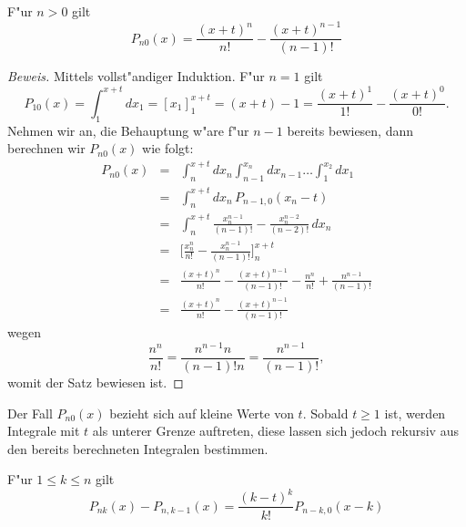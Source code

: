 \begin{satz}F"ur $n>0$ gilt
\begin{equation}
P_{n0}(x)=\frac{(x+t)^n}{n!}-\frac{(x+t)^{n-1}}{(n-1)!}
\end{equation}
\end{satz}
\begin{proof}[Beweis]
Mittels vollst"andiger Induktion. F"ur $n=1$ gilt
\[
P_{10}(x)=\int_1^{x+t}dx_1=[x_1]_1^{x+t}=(x+t)-1=\frac{(x+t)^1}{1!}-\frac{(x+t)^0}{0!}.
\]
Nehmen wir an, die Behauptung w"are f"ur $n-1$ bereits bewiesen, dann
berechnen wir $P_{n0}(x)$ wie folgt:
\begin{eqnarray*}
P_{n0}(x)
&=&\int_n^{x+t}dx_n\int_{n-1}^{x_n}dx_{n-1}\dots\int_1^{x_2}dx_1\\
&=&\int_n^{x+t}dx_n\,P_{n-1,0}(x_n-t)\\
&=&\int_n^{x+t}\frac{x_n^{n-1}}{(n-1)!}-\frac{x_n^{n-2}}{(n-2)!}\,dx_n\\
&=&\biggl[\frac{x_n^n}{n!}-\frac{x_n^{n-1}}{(n-1)!}\biggr]_n^{x+t}\\
&=&
\frac{(x+t)^n}{n!}-\frac{(x+t)^{n-1}}{(n-1)!}
-\frac{n^n}{n!}+\frac{n^{n-1}}{(n-1)!}\\
&=&
\frac{(x+t)^n}{n!}-\frac{(x+t)^{n-1}}{(n-1)!}
\end{eqnarray*}
wegen
\[
\frac{n^n}{n!}=\frac{n^{n-1}n}{(n-1)! n}=\frac{n^{n-1}}{(n-1)!},
\]
womit der Satz bewiesen ist.
\end{proof}

Der Fall $P_{n0}(x)$ bezieht sich auf kleine Werte von $t$. Sobald 
$t\ge 1$ ist, werden Integrale mit $t$ als unterer Grenze auftreten,
diese lassen sich jedoch rekursiv aus den bereits berechneten
Integralen bestimmen.

\begin{satz}\label{kn-rekursion}
F"ur $1\le k\le n$ gilt
\begin{equation}
P_{nk}(x)-P_{n,k-1}(x)
=
\frac{(k-t)^k}{k!}P_{n-k,0}(x-k)
\end{equation}
\end{satz}

